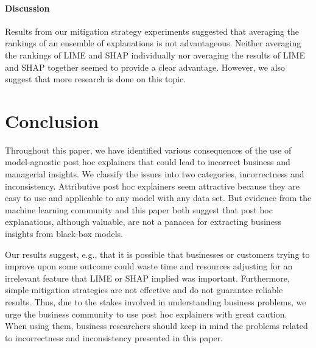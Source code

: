 \documentclass[12pt]{article}    %
\newcommand{\tw}[1]{\textcolor{red}{Tong: #1}}
\begin{document}
\paragraph{Discussion}
 Results from our mitigation strategy experiments suggested that averaging the rankings of an ensemble of explanations is not advantageous. Neither averaging the rankings of LIME and SHAP individually nor averaging the results of LIME and SHAP together seemed to provide a clear advantage. However, we also suggest that more research is done on this topic. 


\section*{Conclusion}
Throughout this paper, we have identified various consequences of the use of model-agnostic post hoc explainers that could lead to incorrect business and managerial insights. We classify the issues into two categories, incorrectness and inconsistency. Attributive post hoc explainers seem attractive because they are easy to use and applicable to any model with any data set. But evidence from the machine learning community and this paper both suggest that post hoc explanations, although valuable, are not a panacea for extracting business insights from black-box models.%

Our results suggest, e.g., that it is possible that businesses or customers trying to improve upon some outcome could waste time and resources adjusting for an irrelevant feature that LIME or SHAP implied was important. Furthermore, simple mitigation strategies are not effective and do not guarantee reliable results. Thus, due to the stakes involved in understanding business problems, we urge the business community to use post hoc explainers with great caution. When using them, business researchers should keep in mind the problems related to incorrectness and inconsistency presented in this paper. %
\end{document}
